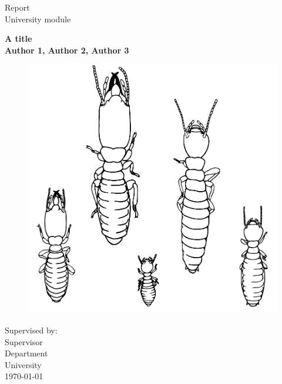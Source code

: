 \begin{titlepage}
\begin{center}

\vspace*{0.5cm}
\Large
Report\\
University module\\
\vspace{1cm}

\Huge
\textbf{A title}\\
\Large
\vspace{1cm}
\textbf{Author 1, Author 2, Author 3}\\
\vspace{1cm}

\begin{figure}[ht]
    \centering
    \includegraphics[scale=0.6]{images/drawing.pdf}
\end{figure}
\vfill

\large
\vspace{0.5cm}
Supervised by:\\
\vspace{0.5cm}
Supervisor\\
Department\\
University\\
\vspace{1cm}
\today\\
\vspace{0.5cm}

\end{center}
\end{titlepage}
